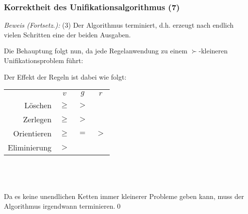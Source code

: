 \documentclass[onlymath]{beamer}
\begin{document}
\begin{frame}[t]\frametitle{Korrektheit des Unifikationsalgorithmus (7)}


\emph{Beweis (Fortsetz.):} (3) Der Algorithmus terminiert, d.h. erzeugt nach endlich vielen Schritten eine der beiden Ausgaben.
\smallskip

Die Behauptung folgt nun, da jede Regelanwendung zu einem $\succ$-kleineren Unifikationsproblem führt:\pause


Der Effekt der Regeln ist dabei wie folgt:

\begin{tabular}{@{}rccc}
	& $v$ & $g$ & $r$ \\[-0.5ex]
\alert{Löschen} & $\geq$ & $>$ & \\[-0.5ex]
\alert{Zerlegen} & $\geq$ & $>$ & \\[-0.5ex]
\alert{Orientieren} & $\geq$ & $=$ & $>$ \\[-0.5ex]
\alert{Eliminierung} & $>$ & &
\end{tabular}\hspace{5mm}
\begin{minipage}{5.0cm}
~\\~\\~\\
Da es keine unendlichen Ketten immer kleinerer Probleme geben kann, muss der Algorithmus irgendwann terminieren.\qed
\end{minipage}

\end{frame}
\end{document}
